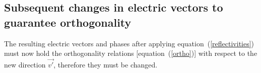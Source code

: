 \documentclass{iucr}
\begin{document}
\subsection{Subsequent changes in electric vectors to guarantee orthogonality}
\label{sec:orthogonality}

The resulting electric vectors and phases after applying equation~(\ref{reflectivities}) must now hold the orthogonality relations [equation~(\ref{ortho})] with respect to the new direction $\vec{v'}$, therefore they must be changed. 



\end{document}

